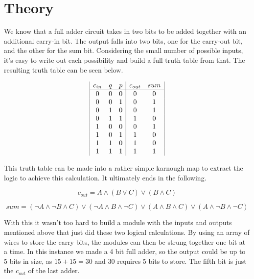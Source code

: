 \documentclass[prb,preprint]{revtex4-1}
\begin{document}
\section{Theory}
We know that a full adder circuit takes in two bits to be added together with an additional carry-in bit. The output falls into two bits, one for the carry-out bit, and the other for the sum bit. Considering the small number of possible inputs, it's easy to write out each possibility and build a full truth table from that. The resulting truth table can be seen below.

\begin{displaymath}
\begin{array}{|c c c|c c|}
c_{in} & q & p & c_{out} & sum\\ 
\hline  
0 & 0 & 0 & 0 & 0\\
0 & 0 & 1 & 0 & 1\\
0 & 1 & 0 & 0 & 1\\
0 & 1 & 1 & 1 & 0\\
1 & 0 & 0 & 0 & 1\\
1 & 0 & 1 & 1 & 0\\
1 & 1 & 0 & 1 & 0\\
1 & 1 & 1 & 1 & 1\\
\end{array}
\end{displaymath}

This truth table can be made into a rather simple karnough map to extract the logic to achieve this calculation. It ultimately ends in the following.

\begin{equation}
c_{out} =  A \land (B \lor C) \lor (B \land C)
\end{equation}

\begin{equation}
sum = (\lnot A \land \lnot B \land C) \lor (\lnot A \land B \land \lnot C) \lor (A \land B \land C) \lor (A \land \lnot B \land \lnot C)
\end{equation}

With this it wasn't too hard to build a module with the inputs and outputs mentioned above that just did these two logical calculations. By using an array of wires to store the carry bits, the modules can then be strung together one bit at a time. In this instance we made a 4 bit full adder, so the output could be up to 5 bits in size, as $15 + 15 = 30$ and 30 requires 5 bits to store. The fifth bit is just the $c_{out}$ of the last adder.
\end{document}
